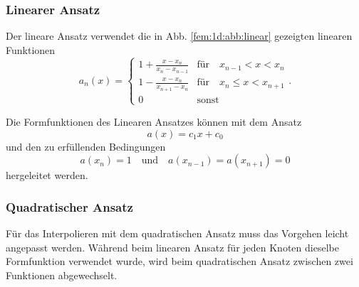 \subsubsection{Linearer Ansatz}
Der lineare Ansatz verwendet die in Abb. \ref{fem:1d:abb:linear} gezeigten linearen Funktionen
\begin{equation}
    a_n(x) = \left\{ \begin{array}{ll}
        1+\frac{x-x_n}{x_n - x_{n-1}} 
            & \text{für} \quad x_{n-1} < x < x_n \\
        1-\frac{x-x_n}{x_{n+1} - x_n} 
            & \text{für} \quad x_n \leq x < x_{n+1} \\
        0
            & \text{sonst}
    \end{array} \right..
\end{equation}

Die Formfunktionen des Linearen Ansatzes können mit dem Ansatz 
\begin{equation}
    a(x) = c_1x + c_0
\end{equation}
und den zu erfüllenden Bedingungen
\begin{equation}
        a(x_n) = 1 
        \quad \text{und} \quad
        a(x_{n-1}) = a(x_{n+1}) = 0
\end{equation}
hergeleitet werden.

\subsubsection{Quadratischer Ansatz}
Für das Interpolieren mit dem quadratischen Ansatz muss das Vorgehen leicht angepasst werden. 
Während beim linearen Ansatz für jeden Knoten dieselbe Formfunktion verwendet wurde, wird beim quadratischen Ansatz zwischen zwei Funktionen abgewechselt.

